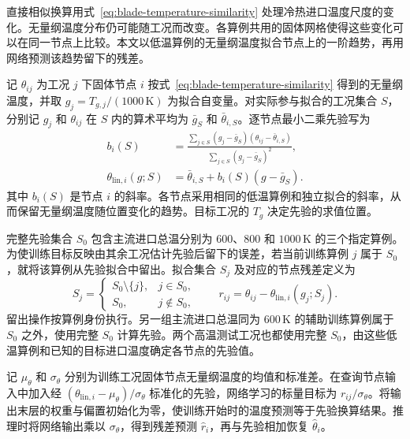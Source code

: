 \documentclass[a4paper,fleqn]{cas-sc}
\begin{document}
直接相似换算用式~\eqref{eq:blade-temperature-similarity} 处理冷热进口温度尺度的变化。无量纲温度分布仍可能随工况而改变。各算例共用的固体网格使得这些变化可以在同一节点上比较。本文以低温算例的无量纲温度拟合节点上的一阶趋势，再用网络预测该趋势留下的残差。

记 $\theta_{ij}$ 为工况 $j$ 下固体节点 $i$ 按式~\eqref{eq:blade-temperature-similarity} 得到的无量纲温度，并取 $g_j=T_{g,j}/(1000\,\mathrm{K})$ 为拟合自变量。对实际参与拟合的工况集合 $S$，分别记 $g_j$ 和 $\theta_{ij}$ 在 $S$ 内的算术平均为 $\bar g_S$ 和 $\bar\theta_{i,S}$。逐节点最小二乘先验写为
\begin{equation}
  \label{eq:blade-linear-prior}
  \begin{aligned}
    b_i(S) &=
      \frac{\displaystyle\sum_{j\in S}(g_j-\bar g_S)
                   (\theta_{ij}-\bar\theta_{i,S})}
           {\displaystyle\sum_{j\in S}(g_j-\bar g_S)^2}, \\
    \theta_{\mathrm{lin},i}(g;S)
      &= \bar\theta_{i,S}+b_i(S)(g-\bar g_S).
  \end{aligned}
\end{equation}
其中 $b_i(S)$ 是节点 $i$ 的斜率。各节点采用相同的低温算例和独立拟合的斜率，从而保留无量纲温度随位置变化的趋势。目标工况的 $T_g$ 决定先验的求值位置。

完整先验集合 $S_0$ 包含主流进口总温分别为 $600$、$800$ 和 $1000\,\mathrm{K}$ 的三个指定算例。为使训练目标反映由其余工况估计先验后留下的误差，若当前训练算例 $j$ 属于 $S_0$，就将该算例从先验拟合中留出。拟合集合 $S_j$ 及对应的节点残差定义为
\begin{equation}
  \label{eq:blade-training-residual}
  S_j=
  \begin{cases}
    S_0\setminus\{j\}, & j\in S_0, \\
    S_0, & j\notin S_0 ,
  \end{cases}
  \qquad
  r_{ij}=\theta_{ij}-\theta_{\mathrm{lin},i}(g_j;S_j).
\end{equation}
留出操作按算例身份执行。另一组主流进口总温同为 $600\,\mathrm{K}$ 的辅助训练算例属于 $S_0$ 之外，使用完整 $S_0$ 计算先验。两个高温测试工况也都使用完整 $S_0$，由这些低温算例和已知的目标进口温度确定各节点的先验值。

记 $\mu_\theta$ 和 $\sigma_\theta$ 分别为训练工况固体节点无量纲温度的均值和标准差。在查询节点输入中加入经 $(\theta_{\mathrm{lin},i}-\mu_\theta)/\sigma_\theta$ 标准化的先验，网络学习的标量目标为 $r_{ij}/\sigma_\theta$。将输出末层的权重与偏置初始化为零，使训练开始时的温度预测等于先验换算结果。推理时将网络输出乘以 $\sigma_\theta$，得到残差预测 $\widehat r_i$，再与先验相加恢复 $\widehat\theta_i$。
\end{document}
